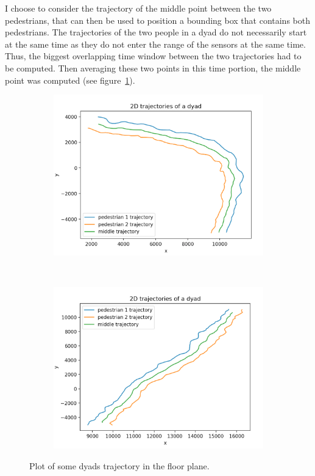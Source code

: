 \documentclass[12pt,a4paper,twoside]{article}
\begin{document}
I choose to consider the trajectory of the middle point between the two pedestrians, that can then be used to position a bounding box that contains both pedestrians. The trajectories of the two people in a dyad do not necessarily start at the same time as they do not enter the range of the sensors at the same time. Thus, the biggest overlapping time window between the two trajectories had to be computed. Then averaging these two points in this time portion, the middle point was computed (see figure~\ref{fig:trajectories}).

\begin{figure}
    \centering
    \begin{subfigure}[b]{0.45\textwidth}
        \includegraphics[width=\textwidth]{images/traj1}
    \end{subfigure}
    ~
    \begin{subfigure}[b]{0.45\textwidth}
        \includegraphics[width=\textwidth]{images/traj2}
    \end{subfigure}
    \caption{Plot of some dyads trajectory in the floor plane.}
    \label{fig:trajectories}
\end{figure}
\end{document}
